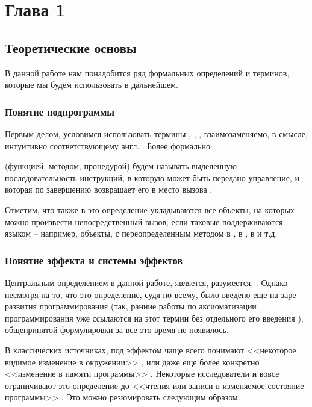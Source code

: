 \section{Глава 1}

\subsection{Теоретические основы}

В данной работе нам понадобится ряд формальных определений и терминов, которые мы будем использовать в дальнейшем. 

\subsubsection{Понятие подпрограммы}

Первым делом, условимся использовать термины , , ,  взаимозаменяемо, в смысле, интуитивно соответствующему англ. . Более формально:

\begin{definition}
     (функцией, методом, процедурой) будем называть выделенную последовательность инструкций, в которую может быть передано управление, и которая по завершению возвращает его в место вызова \cite{Wheeler52}.
\end{definition}

Отметим, что также в это определение укладываются все объекты, на которых можно произвести непосредственный вызов, если таковые поддерживаются языком -- например, объекты, с переопределенным методом  в ,  в ,  в  и т.д.





\subsubsection{Понятие эффекта и системы эффектов}

Центральным определением в данной работе, является, разумеется, . Однако несмотря на то, что это определение, судя по всему, было введено еще на заре развития программирования (так, ранние работы по аксиоматизации программирования уже ссылаются на этот термин без отдельного его введения \cite{Hoare69, Schwartz67}), общепринятой формулировки за все это время не появилось. 

В классических источниках, под эффектом чаще всего понимают <<некоторое видимое изменение в окружении>> \cite{Luc88}, или даже еще более конкретно <<изменение в памяти программы>> \cite{Vak09}. Некоторые исследователи и вовсе ограничивают это определение до <<чтения или записи в изменяемое состояние программы>> \cite{Green99}. Это можно резюмировать следующим образом:

